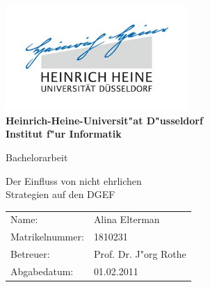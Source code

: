 \documentclass[11pt, a4paper, twoside]{article}
\numberwithin{equation}{section}
\begin{document}
\begin{titlepage}
\begin{center}
\includegraphics[height=4cm]{hhulogo.jpg}\\
\vspace{1em}
\textbf{
\Large Heinrich-Heine-Universit"at D"usseldorf\\
\smallskip
\Large Institut f"ur Informatik\\
\smallskip}

\vspace{3em}
{\Huge Bachelorarbeit}

\vspace{4em} {\Huge Der Einfluss von nicht ehrlichen \\ \vspace{1em} Strategien auf den DGEF}
\end{center}

\vfill

\begin{center}
{\large
\begin{tabular}[l]{ll}
Name: & Alina Elterman\\
Matrikelnummer: & 1810231\\
Betreuer: & Prof. Dr. J"org Rothe\\
Abgabedatum: & 01.02.2011
\end{tabular}
}
\end{center}
\end{titlepage}
\newpage
\thispagestyle{empty}
\tableofcontents
\newpage
\thispagestyle{empty}
\printnomenclature
\newpage
\thispagestyle{empty}
\listoffigures
\newpage
{}
\setcounter{page}{1}
\end{document}
